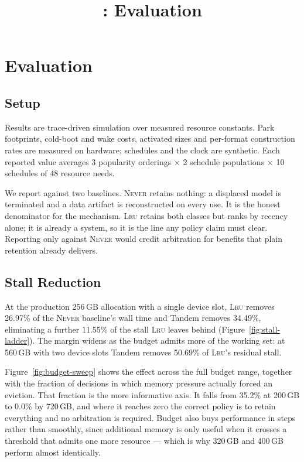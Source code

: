 \documentclass[10pt,twocolumn]{article}
\title{\sysname: Evaluation}
\date{}
\newcommand{\sysname}{Tandem\xspace}   %
\begin{document}
\maketitle

\section{Evaluation}

\subsection{Setup}

Results are trace-driven simulation over measured resource constants. Park
footprints, cold-boot and wake costs, activated sizes and per-format
construction rates are measured on hardware; schedules and the clock are
synthetic. Each reported value averages 3 popularity orderings $\times$ 2
schedule populations $\times$ 10 schedules of 48 resource needs.

We report against two baselines. \textsc{Never} retains nothing: a displaced
model is terminated and a data artifact is reconstructed on every use. It is
the honest denominator for the mechanism. \textsc{Lru} retains both classes
but ranks by recency alone; it is already a system, so it is the line any
policy claim must clear. Reporting only against \textsc{Never} would credit
arbitration for benefits that plain retention already delivers.

\subsection{Stall Reduction}

At the production 256\,GB allocation with a single device slot, \textsc{Lru}
removes 26.97\% of the \textsc{Never} baseline's wall time and \sysname
removes 34.49\%, eliminating a further 11.55\% of the stall \textsc{Lru}
leaves behind (Figure~\ref{fig:stall-ladder}). The margin widens as the budget
admits more of the working set: at 560\,GB with two device slots \sysname
removes 50.69\% of \textsc{Lru}'s residual stall.

Figure~\ref{fig:budget-sweep} shows the effect across the full budget range,
together with the fraction of decisions in which memory pressure actually
forced an eviction. That fraction is the more informative axis. It falls from
35.2\% at 200\,GB to 0.0\% by 720\,GB, and where it reaches zero the correct
policy is to retain everything and no arbitration is required. Budget also
buys performance in steps rather than smoothly, since additional memory is
only useful when it crosses a threshold that admits one more resource --- which
is why 320\,GB and 400\,GB perform almost identically.
\end{document}
